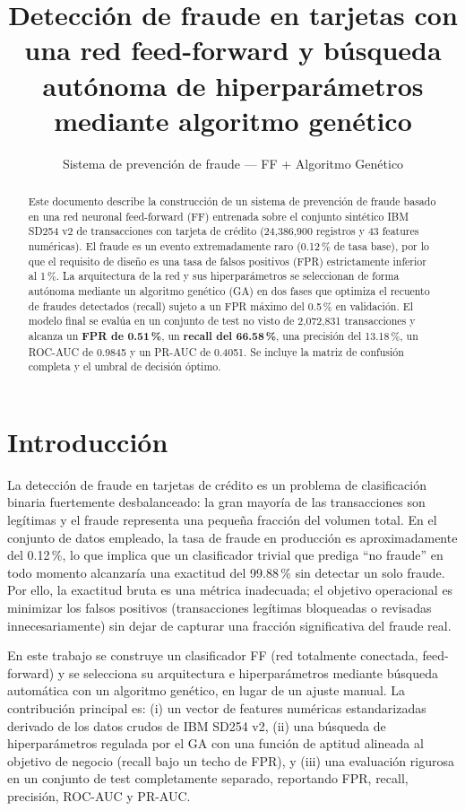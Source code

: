 \documentclass[11pt,a4paper]{article}
\title{\textbf{Detección de fraude en tarjetas con una red feed-forward y búsqueda autónoma de hiperparámetros mediante algoritmo genético}}
\author{Sistema de prevenci{\'o}n de fraude --- FF + Algoritmo Gen\'etico}
\date{}
\begin{document}
\maketitle

\begin{abstract}
\noindent Este documento describe la construcci{\'o}n de un sistema de prevenci{\'o}n de fraude basado en una red neuronal feed-forward (FF) entrenada sobre el conjunto sint{\'e}tico IBM SD254 v2 de transacciones con tarjeta de crédito (24,386,900 registros y 43 features numéricas). El fraude es un evento extremadamente raro (0.12\,\% de tasa base), por lo que el requisito de diseño es una tasa de falsos positivos (FPR) estrictamente inferior al 1\,\%. La arquitectura de la red y sus hiperparámetros se seleccionan de forma autónoma mediante un algoritmo genético (GA) en dos fases que optimiza el recuento de fraudes detectados (recall) sujeto a un FPR máximo del 0.5\,\% en validación. El modelo final se evalúa en un conjunto de test no visto de 2,072,831 transacciones y alcanza un \textbf{FPR de 0.51\,\%}, un \textbf{recall del 66.58\,\%}, una precisi{\'o}n del 13.18\,\%, un ROC-AUC de 0.9845 y un PR-AUC de 0.4051. Se incluye la matriz de confusi{\'o}n completa y el umbral de decisión óptimo.
\end{abstract}

\section{Introducción}
La detección de fraude en tarjetas de crédito es un problema de clasificación binaria fuertemente desbalanceado: la gran mayoría de las transacciones son legítimas y el fraude representa una pequeña fracción del volumen total. En el conjunto de datos empleado, la tasa de fraude en producción es aproximadamente del 0.12\,\%, lo que implica que un clasificador trivial que prediga ``no fraude'' en todo momento alcanzaría una exactitud del 99.88\,\% sin detectar un solo fraude. Por ello, la exactitud bruta es una métrica inadecuada; el objetivo operacional es minimizar los falsos positivos (transacciones legítimas bloqueadas o revisadas innecesariamente) sin dejar de capturar una fracción significativa del fraude real.

En este trabajo se construye un clasificador FF (red totalmente conectada, feed-forward) y se selecciona su arquitectura e hiperparámetros mediante búsqueda automática con un algoritmo genético, en lugar de un ajuste manual. La contribución principal es: (i) un vector de features numéricas estandarizadas derivado de los datos crudos de IBM SD254 v2, (ii) una búsqueda de hiperparámetros regulada por el GA con una función de aptitud alineada al objetivo de negocio (recall bajo un techo de FPR), y (iii) una evaluación rigurosa en un conjunto de test completamente separado, reportando FPR, recall, precisión, ROC-AUC y PR-AUC.
\end{document}
